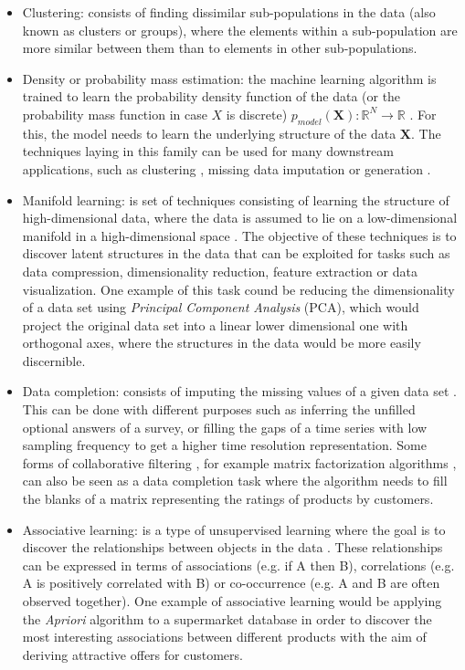 \begin{itemize}
	\item Clustering: consists of finding dissimilar sub-populations in the data (also known as clusters or groups), where the elements within a sub-population are more similar between them than to elements in other sub-populations.
	\item Density or probability mass estimation: the machine learning algorithm is trained to learn the probability density function of the data (or the probability mass function in case $X$ is discrete) $p_{model}(\textbf{X}): \mathbb{R}^N \rightarrow \mathbb{R}$ \autocite{Goodfellow2016}. For this, the model needs to learn the underlying structure of the data $\mathbf{X}$. The techniques laying in this family can be used for many downstream applications, such as clustering \autocite{wang2006}, missing data imputation \autocite{qichuan2015} or generation \autocite{liu2020a}.
	\item Manifold learning: is set of techniques consisting of learning the structure of high-dimensional data, where the data is assumed to lie on a low-dimensional manifold in a high-dimensional space \autocite{murphy2012}. The objective of these techniques is to discover latent structures in the data that can be exploited for tasks such as data compression, dimensionality reduction, feature extraction or data visualization. One example of this task cound be reducing the dimensionality of a data set using \textit{Principal Component Analysis} (PCA), which would project the original data set into a linear lower dimensional one with orthogonal axes, where the structures in the data would be more easily discernible.
	\item Data completion: consists of imputing the missing values of a given data set \autocite{vanburen_2018}. This can be done with different purposes such as inferring the unfilled optional answers of a survey, or filling the gaps of a time series with low sampling frequency to get a higher time resolution representation. Some forms of collaborative filtering \autocite{falk2019}, for example matrix factorization algorithms \autocite{koren2009}, can also be seen as a data completion task where the algorithm needs to fill the blanks of a matrix representing the ratings of products by customers.
	\item Associative learning:  is a type of unsupervised learning where the goal is to discover the relationships between objects in the data \autocite{zhang2002}. These relationships can be expressed in terms of associations (e.g. if A then B), correlations (e.g. A is positively correlated with B) or co-occurrence (e.g. A and B are often observed together). One example of associative learning would be applying the \textit{Apriori} algorithm \autocite{agrawal1996} to a supermarket database in order to discover the most interesting associations between different products with the aim of deriving attractive offers for customers.

\end{itemize}
